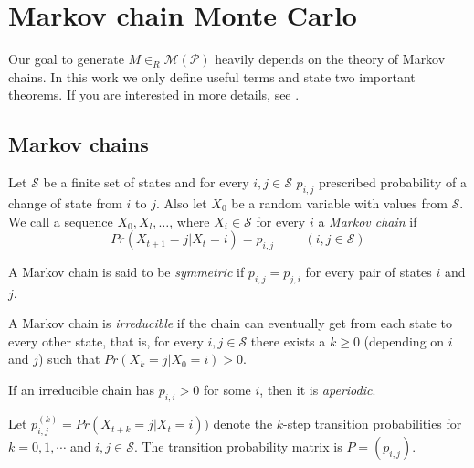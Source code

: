 \chapter{Markov chain Monte Carlo}
\label{chap:mcmc}
Our goal to generate $M\in_R\mathcal{M}(\mathcal{P})$ heavily depends on the theory of Markov chains. In this work we only define useful terms and state two important theorems. If you are interested in more details, see \cite{Madras}.

\section{Markov chains}
\begin{defn}
Let $\mathcal{S}$ be a finite set of states and for every $i,j\in\mathcal{S}$ $p_{i,j}$ prescribed probability of a change of state from $i$ to $j$. Also let $X_0$ be a random variable with values from $\mathcal{S}$. We call a sequence $X_0,X_l,\dots$, where $X_i\in\mathcal{S}$ for every $i$ a \emph{Markov chain} if
$$Pr(X_{t+1}=j|X_t=i)=p_{i,j} \hspace{1cm} (i,j\in\mathcal{S})$$
\end{defn}
\begin{defn}
A Markov chain is said to be \emph{symmetric} if $p_{i,j}=p_{j,i}$ for every pair of states $i$ and $j$.
\end{defn}
\begin{defn}
A Markov chain is \emph{irreducible} if the chain can eventually get from each state to every other state, that is, for every $i,j\in\mathcal{S}$ there exists a $k\geq0$ (depending on $i$ and $j$) such that $Pr(X_k=j|X_0=i)>0$.
\end{defn}
\begin{defn}
If an irreducible chain has $p_{i,i}>0$ for some $i$, then it is \emph{aperiodic}.
\end{defn}
Let $p_{i,j}^{(k)}=Pr(X_{t+k}=j|X_t=i))$ denote the $k$-step transition probabilities for $k=0,1,\cdots$ and $i,j\in\mathcal{S}$. The transition probability matrix is $P=(p_{i,j})$.


